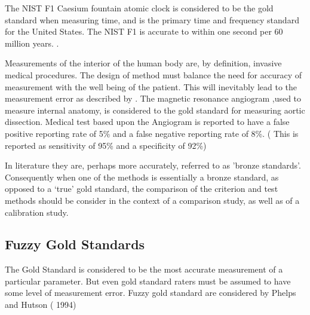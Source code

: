\documentclass[Chap1bmain.tex]{subfiles}
\begin{document}
The NIST F1 Caesium fountain atomic clock is considered to be the gold standard when measuring time, and is the primary time and frequency standard for the United States. The NIST F1 is accurate
to within one second per 60 million years. \citep{NIST}.

Measurements of the interior of the human body are, by definition, invasive medical procedures. The design of method must balance the need for accuracy of measurement with the well being of the patient. This will inevitably lead to the measurement error as described by \citet{DunnSEME}. The magnetic resonance angiogram ,used to measure internal anatomy,  is considered to the gold standard for measuring aortic dissection. Medical test based upon the Angiogram is reported to have a false positive reporting rate of 5\% and a false negative reporting rate of 8\%. ( This is
reported as sensitivity of 95\% and a specificity of 92\%)
\citep{ACR}

In literature they are, perhaps more accurately, referred to as
'bronze standards'. Consequently when one of the methods is
essentially a bronze standard, as opposed to a `true' gold
standard, the comparison of the criterion and test methods should
be consider in the context of a comparison study, as well as of a
calibration study.



\subsection{Fuzzy Gold Standards} The Gold Standard is considered to be the most
accurate measurement of a particular parameter. But even gold
standard raters must be assumed to have some level of measurement
error. Fuzzy gold standard are considered by Phelps and Hutson (
1994)

\end{document}
